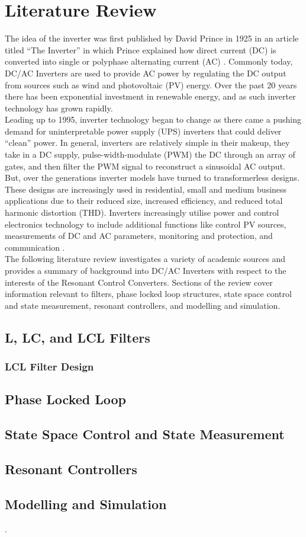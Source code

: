 \chapter{Literature Review}
The idea of the inverter was first published by David Prince in 1925 in an article titled ``The Inverter'' in which Prince explained how direct current (DC) is converted into single or polyphase alternating current (AC) . Commonly today, DC/AC Inverters are used to provide AC power by regulating the DC output from sources such as wind and photovoltaic (PV) energy. Over the past 20 years there has been exponential investment in renewable energy, and as such inverter technology has grown rapidly\cite{476602}.\\
Leading up to 1995, inverter technology began to change as there came a pushing demand for uninterpretable power supply (UPS) inverters that could deliver ``clean'' power. In general, inverters are relatively simple in their makeup, they take in a DC supply, pulse-width-modulate (PWM) the DC through an array of gates, and then filter the PWM signal to reconstruct a sinusoidal AC output. But, over the generations inverter models have turned to transformerless designs. These designs are increasingly used in residential, small and medium business applications due to their reduced size, increased efficiency, and reduced total harmonic distortion (THD). Inverters increasingly utilise power and control electronics technology to include additional functions like control PV sources, measurements of DC and AC parameters, monitoring and protection, and communication \cite{474857,5730644}.\\
The following literature review investigates a variety of academic sources and provides a summary of background into DC/AC Inverters with respect to the interests of the Resonant Control Converters. Sections of the review cover information relevant to filters, phase locked loop structures, state space control and state measurement, resonant controllers, and modelling and simulation.
\newpage
\section{L, LC, and LCL Filters}
    \subsection{LCL Filter Design}
    
\section{Phase Locked Loop}
\section{State Space Control and State Measurement}
\section{Resonant Controllers}
\section{Modelling and Simulation}.

